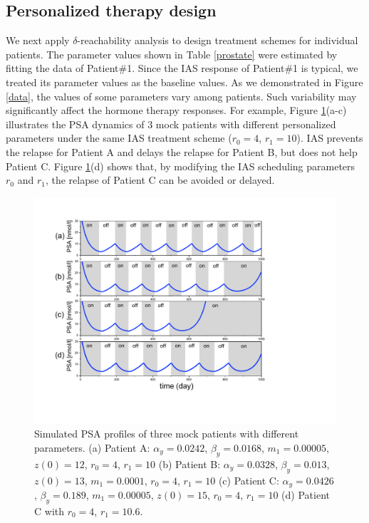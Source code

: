 \subsection{Personalized therapy design}
We next apply $\delta$-reachability analysis to design treatment schemes for individual patients. The parameter values shown in Table \ref{prostate} were estimated by fitting the data of Patient\#1. Since the IAS response of Patient\#1 is typical, we treated its parameter values as the baseline values. As we demonstrated in Figure \ref{data}, the values of some parameters vary among patients. Such variability may significantly affect the hormone therapy responses. 
For example, Figure \ref{patients}(a-c) illustrates the PSA dynamics of $3$ mock patients with different personalized parameters under the same IAS treatment scheme ($r_0=4$, $r_1=10$). IAS prevents the relapse for Patient A and delays the relapse for Patient B, but does not help Patient C. Figure \ref{patients}(d) shows that, by modifying the IAS scheduling parameters $r_0$ and $r_1$, the relapse of Patient C can be avoided or delayed. 

\begin{figure}[htb]
\centering
\includegraphics[scale=0.43]{fig-mock}
\caption{Simulated PSA profiles of three mock patients with different parameters. (a) Patient A: $\alpha_y=0.0242$, $\beta_y=0.0168$, $m_1=0.00005$, $z(0)=12$, $r_0=4$, $r_1=10$ (b) Patient B: $\alpha_y=0.0328$, $\beta_y=0.013$, $z(0)=13$, $m_1=0.0001$, $r_0=4$, $r_1=10$ (c) Patient C: $\alpha_y=0.0426$, $\beta_y=0.189$, $m_1=0.00005$, $z(0)=15$, $r_0=4$, $r_1=10$ (d) Patient C with $r_0=4$, $r_1=10.6$.}
\label{patients}
\end{figure}


